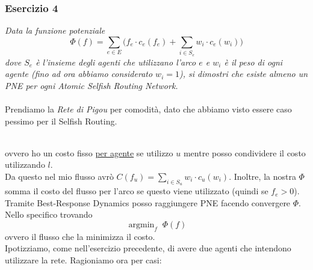\documentclass{article}
\DeclareMathOperator*{\argmin}{argmin}
\begin{document}
            \subsubsection{Esercizio 4}
                \textit{Data la funzione potenziale}
                \[
                    \varPhi(f) = \sum_{e \in E}\Bigg( f_e \cdot c_e(f_e) + \sum_{i \in S_e} w_i \cdot c_e(w_i) \Bigg)
                \]
                \textit{dove $ S_e $ è l'insieme degli agenti che utilizzano l'arco $ e $ e $ w_i $ è il peso di ogni agente (fino ad ora abbiamo considerato $ w_i = 1 $), si dimostri che esiste almeno un PNE per ogni Atomic Selfish Routing Network.}\\
                \\
                Prendiamo la \textit{Rete di Pigou} per comodità, dato che abbiamo visto essere caso pessimo per il Selfish Routing.\\
                \begin{figure}[htb]\hspace*{\fill}%
                    \hspace*{\fill}
                \end{figure}\\
                ovvero ho un costo fisso \underline{per agente} se utilizzo $ u $ mentre posso condividere il costo utilizzando $ l $.\\
                Da questo nel mio flusso avrò $ C(f_u) = \sum_{i \in S_u} w_i \cdot c_u(w_i) $. Inoltre, la nostra $ \varPhi $ somma il costo del flusso per l'arco se questo viene utilizzato (quindi se $ f_e > 0 $).\\
                Tramite Best-Response Dynamics posso raggiungere PNE facendo convergere $ \varPhi $. Nello specifico trovando
                \[
                    \argmin_{f}\; \varPhi(f)    
                \]
                ovvero il flusso che la minimizza il costo.\\
                Ipotizziamo, come nell'esercizio precedente, di avere due agenti che intendono utilizzare la rete. Ragioniamo ora per casi:
\end{document}
